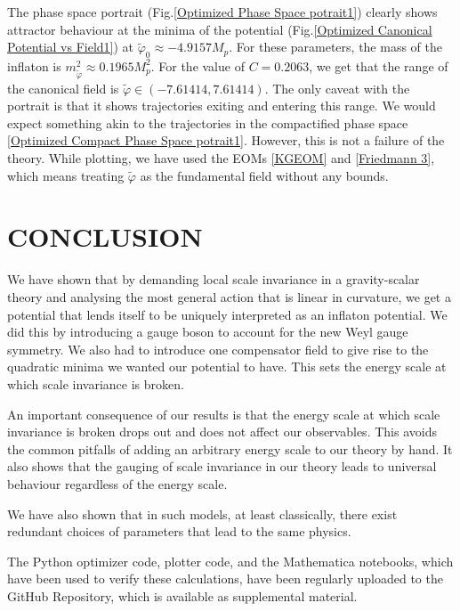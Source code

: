 \documentclass[aps,prd,reprint,preprintnumbers,showpacs,floatfix,nofootinbib,superscript address]{revtex4-2}
\begin{document}
The phase space portrait (Fig.\ref{Optimized Phase Space potrait1}) clearly shows attractor behaviour at the minima of the potential (Fig.\ref{Optimized Canonical Potential vs Field1}) at $\tilde{\varphi}_0 \approx -4.9157 M_p$. For these parameters, the mass of the inflaton is $m_{\tilde{\varphi}}^2 \approx  0.1965 M_p^2$. For the value of $C = 0.2063$, we get that the range of the canonical field is $\tilde{\varphi} \in (-7.61414,7.61414)$. The only caveat with the portrait is that it shows trajectories exiting and entering this range. We would expect something akin to the trajectories in the compactified phase space \ref{Optimized Compact Phase Space potrait1}. However, this is not a failure of the theory. While plotting, we have used the EOMs \ref{KGEOM} and \ref{Friedmann 3}, which means treating $\tilde{\varphi}$ as the fundamental field without any bounds.


\section{CONCLUSION}
We have shown that by demanding local scale invariance in a gravity-scalar theory and analysing the most general action that is linear in curvature, we get a potential that lends itself to be uniquely interpreted as an inflaton potential. We did this by introducing a gauge boson to account for the new Weyl gauge symmetry. We also had to introduce one compensator field to give rise to the quadratic minima we wanted our potential to have. This sets the energy scale at which scale invariance is broken.

An important consequence of our results is that the energy scale at which scale invariance is broken drops out and does not affect our observables. This avoids the common pitfalls of adding an arbitrary energy scale to our theory by hand. It also shows that the gauging of scale invariance in our theory leads to universal behaviour regardless of the energy scale.

We have also shown that in such models, at least classically, there exist redundant choices of parameters that lead to the same physics. 

The Python optimizer code, plotter code, and the Mathematica notebooks, which have been used to verify these calculations, have been regularly uploaded to the GitHub Repository, which is available as supplemental material. 

\newpage
\,\,
\newpage

\appendix
\end{document}
